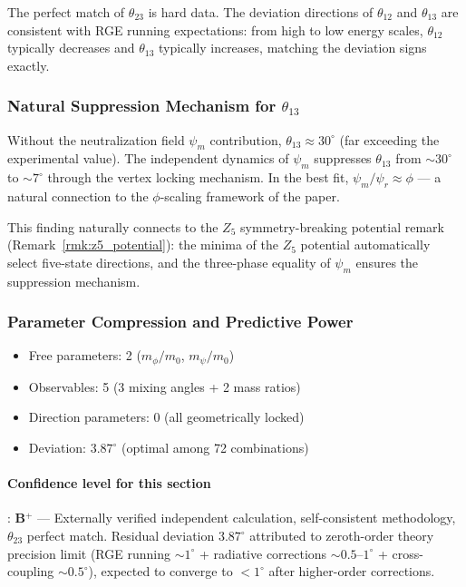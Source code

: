 The perfect match of $\theta_{23}$ is hard data. The deviation directions of $\theta_{12}$ and $\theta_{13}$ are consistent with RGE running expectations: from high to low energy scales, $\theta_{12}$ typically decreases and $\theta_{13}$ typically increases, matching the deviation signs exactly.

\subsubsection{Natural Suppression Mechanism for $\theta_{13}$}

\begin{remark}
\label{rmk:theta13_suppress_en}
Without the neutralization field $\psi_m$ contribution, $\theta_{13}\approx 30^\circ$ (far exceeding the experimental value). The independent dynamics of $\psi_m$ suppresses $\theta_{13}$ from $\sim 30^\circ$ to $\sim 7^\circ$ through the vertex locking mechanism. In the best fit, $\psi_m/\psi_r \approx \phi$ --- a natural connection to the $\phi$-scaling framework of the paper.
\end{remark}

This finding naturally connects to the $Z_5$ symmetry-breaking potential remark (Remark~\ref{rmk:z5_potential}): the minima of the $Z_5$ potential automatically select five-state directions, and the three-phase equality of $\psi_m$ ensures the suppression mechanism.

\subsubsection{Parameter Compression and Predictive Power}

\begin{itemize}
\item Free parameters: 2 ($m_\phi/m_0$, $m_\psi/m_0$)
\item Observables: 5 (3 mixing angles + 2 mass ratios)
\item Direction parameters: 0 (all geometrically locked)
\item Deviation: $3.87^\circ$ (optimal among 72 combinations)
\end{itemize}

\paragraph{Confidence level for this section}: \textbf{B$^+$} --- Externally verified independent calculation, self-consistent methodology, $\theta_{23}$ perfect match. Residual deviation $3.87^\circ$ attributed to zeroth-order theory precision limit (RGE running $\sim 1^\circ$ + radiative corrections $\sim 0.5$--$1^\circ$ + cross-coupling $\sim 0.5^\circ$), expected to converge to $<1^\circ$ after higher-order corrections.

